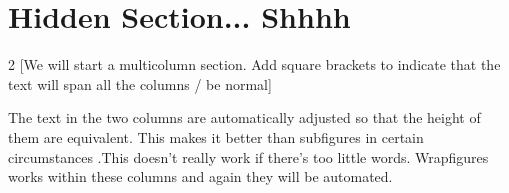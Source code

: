 \documentclass[a4paper]{report}
\begin{document}
\newpage
\section*{Hidden Section... Shhhh}

\begin{multicols}{2}
	[We will start a multicolumn section. 
	Add square brackets to indicate that the text will span all the columns / be normal]
	
	The text in the two columns are automatically adjusted so that the height of them are equivalent. This makes it better than subfigures in certain circumstances .This doesn't really work if there's too little words. Wrapfigures works within these columns and again they will be automated.\\
\end{multicols}

\newpage


\end{document}
